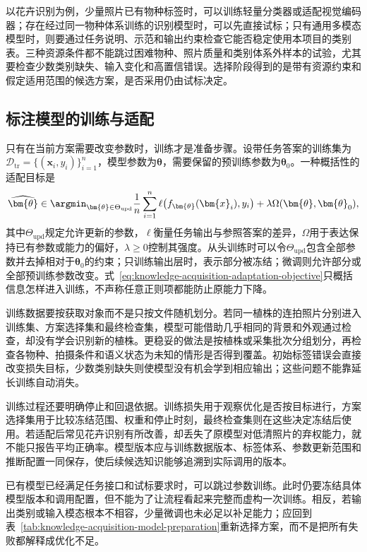 以花卉识别为例，少量照片已有物种标签时，可以训练轻量分类器或适配视觉编码器；存在经过同一物种体系训练的识别模型时，可以先直接试标；只有通用多模态模型时，则要通过任务说明、示范和输出约束检查它能否稳定使用本项目的类别表。三种资源条件都不能跳过困难物种、照片质量和类别体系外样本的试验，尤其要检查少数类别缺失、输入变化和高置信错误。选择阶段得到的是带有资源约束和假定适用范围的候选方案，是否采用仍由试标决定。

\subsection{标注模型的训练与适配}
\label{sec:knowledge-acquisition-model-training-adaptation}

只有在当前方案需要改变参数时，训练才是准备步骤。设带任务答案的训练集为$\mathcal{D}_{\mathrm{tr}}=\{(\bm{x}_i,y_i)\}_{i=1}^{n}$，模型参数为$\bm{\theta}$，需要保留的预训练参数为$\bm{\theta}_0$。一种概括性的适配目标是
\begin{equation}
  \widehat{\bm{\theta}}
  \in
  \argmin_{\bm{\theta}\in\Theta_{\mathrm{upd}}}
  \frac{1}{n}\sum_{i=1}^{n}\ell\!\left(f_{\bm{\theta}}(\bm{x}_i),y_i\right)
  +\lambda\Omega(\bm{\theta},\bm{\theta}_0),
  \label{eq:knowledge-acquisition-adaptation-objective}
\end{equation}
其中$\Theta_{\mathrm{upd}}$规定允许更新的参数，$\ell$衡量任务输出与参照答案的差异，$\Omega$用于表达保持已有参数或能力的偏好，$\lambda\geq0$控制其强度。从头训练时可以令$\Theta_{\mathrm{upd}}$包含全部参数并去掉相对于$\bm{\theta}_0$的约束；只训练输出层时，表示部分被冻结；微调则允许部分或全部预训练参数改变。式~\eqref{eq:knowledge-acquisition-adaptation-objective}只概括信息怎样进入训练，不声称任意正则项都能防止原能力下降。

训练数据要按获取对象而不是只按文件随机划分。若同一植株的连拍照片分别进入训练集、方案选择集和最终检查集，模型可能借助几乎相同的背景和外观通过检查，却没有学会识别新的植株。更稳妥的做法是按植株或采集批次分组划分，再检查各物种、拍摄条件和语义状态为未知的情形是否得到覆盖。初始标签错误会直接改变损失目标，少数类别缺失则使模型没有机会学到相应输出；这些问题不能靠延长训练自动消失。

训练过程还要明确停止和回退依据。训练损失用于观察优化是否按目标进行，方案选择集用于比较冻结范围、权重和停止时刻，最终检查集则在这些决定冻结后使用。若适配后常见花卉识别有所改善，却丢失了原模型对低清照片的弃权能力，就不能只报告平均正确率。模型版本应与训练数据版本、标签体系、参数更新范围和推断配置一同保存，使后续候选知识能够追溯到实际调用的版本。

已有模型已经满足任务接口和试标要求时，可以跳过参数训练。此时仍要冻结具体模型版本和调用配置，但不能为了让流程看起来完整而虚构一次训练。相反，若输出类别或输入模态根本不相容，少量微调也未必足以补足能力；应回到表~\ref{tab:knowledge-acquisition-model-preparation}重新选择方案，而不是把所有失败都解释成优化不足。

